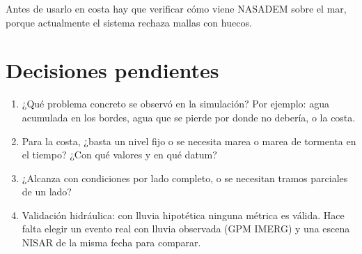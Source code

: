 \documentclass[11pt,a4paper]{article}
\begin{document}
\begin{nota}
Antes de usarlo en costa hay que verificar cómo viene NASADEM sobre el mar, porque actualmente el sistema rechaza mallas con huecos.
\end{nota}

\section{Decisiones pendientes}

\begin{enumerate}
  \item ¿Qué problema concreto se observó en la simulación? Por ejemplo: agua acumulada en los bordes, agua que se pierde por donde no debería, o la costa.
  \item Para la costa, ¿basta un nivel fijo o se necesita marea o marea de tormenta en el tiempo? ¿Con qué valores y en qué datum?
  \item ¿Alcanza con condiciones por lado completo, o se necesitan tramos parciales de un lado?
  \item Validación hidráulica: con lluvia hipotética ninguna métrica es válida. Hace falta elegir un evento real con lluvia observada (GPM IMERG) y una escena NISAR de la misma fecha para comparar.
\end{enumerate}
\end{document}

